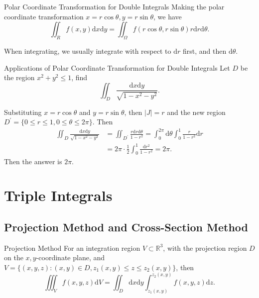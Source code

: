 \begin{proposition}{Polar Coordinate Transformation for Double Integrals}{}
  Making the polar coordinate transformation $x = r\cos\theta, y = r \sin
  \theta$,
  we have
  \begin{equation}
    \iint_R f(x, y)\mathrm{d} x \mathrm{d} y = \iint_{\Omega}f(r \cos \theta, r \sin \theta) r \mathrm{d} r \mathrm{d} \theta.
  \end{equation}
\end{proposition}

\begin{note}
  When integrating, we usually integrate with respect to $\mathrm{d} r$ first,
  and then $\mathrm{d} \theta$.
\end{note}

\begin{example}{Applications of Polar Coordinate Transformation for Double Integrals}{}
  Let $D$ be the region $x^2 + y^2 \leq 1$, find
  \begin{equation}
    \iint_D \frac{\mathrm{d} x\mathrm{d}y}{\sqrt{1 - x^2 - y^2}}.
  \end{equation}
\end{example}

\begin{solution}
  Substituting $x = r \cos \theta$ and $y = r \sin \theta$,
  then $|J| = r$ and the new region $D^{\prime} = \{0 \leq r \leq 1, 0 \leq
  \theta \leq 2\pi\}$. Then
  \begin{align}
    \iint_D \frac{\mathrm{d} x\mathrm{d} y}{\sqrt{1 - x^2 - y^2}}
    &= \iint _{D^{\prime}} \frac{r \mathrm{d}r \mathrm{d}\theta}{1 - r^2}
     = \int_0^{2\pi} \mathrm{d} \theta \int_0^1 \frac{r}{1-r^2}\mathrm{d} r\\
    &= 2\pi \cdot \frac{1}{2}\int_0^1 \frac{\mathrm{d} r^2}{1 - r^2}
     = 2\pi.
  \end{align}
  Then the answer is $2\pi$.
\end{solution}

\section{Triple Integrals}

\subsection{Projection Method and Cross-Section Method}

\begin{proposition}{Projection Method}{}
  For an integration region $V \subset \mathbb{R}^3$,
  with the projection region $D$ on the $x,y$-coordinate plane, and
  $V = \{(x,y,z): (x, y) \in D, z_1(x, y) \leq z \leq z_2(x,y)\}$, then
  \begin{equation}
    \iiint _V f(x,y,z) \mathrm{d}V = \iint _D \mathrm{d}x \mathrm{d}y \int _{z_1(x,y)}^{z_2(x,y)}f(x,y,z)\mathrm{d}z.
  \end{equation}
\end{proposition}

